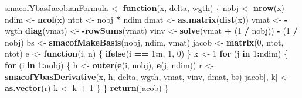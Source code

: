 \documentclass[
  12pt,
]{article}
\newenvironment{Shaded}{\begin{snugshade}}{\end{snugshade}}
\newcommand{\ControlFlowTok}[1]{\textcolor[rgb]{0.13,0.29,0.53}{\textbf{#1}}}
\newcommand{\DecValTok}[1]{\textcolor[rgb]{0.00,0.00,0.81}{#1}}
\newcommand{\FunctionTok}[1]{\textcolor[rgb]{0.13,0.29,0.53}{\textbf{#1}}}
\newcommand{\NormalTok}[1]{#1}
\newcommand{\OtherTok}[1]{\textcolor[rgb]{0.56,0.35,0.01}{#1}}
\newcommand{\SpecialCharTok}[1]{\textcolor[rgb]{0.81,0.36,0.00}{\textbf{#1}}}
\begin{document}
\begin{Shaded}
\begin{Highlighting}[]
\NormalTok{smacofYbasJacobianFormula }\OtherTok{\textless{}{-}} \ControlFlowTok{function}\NormalTok{(x, delta, wgth) \{}
\NormalTok{  nobj }\OtherTok{\textless{}{-}} \FunctionTok{nrow}\NormalTok{(x)}
\NormalTok{  ndim }\OtherTok{\textless{}{-}} \FunctionTok{ncol}\NormalTok{(x)}
\NormalTok{  ntot }\OtherTok{\textless{}{-}}\NormalTok{ nobj }\SpecialCharTok{*}\NormalTok{ ndim}
\NormalTok{  dmat }\OtherTok{\textless{}{-}} \FunctionTok{as.matrix}\NormalTok{(}\FunctionTok{dist}\NormalTok{(x))}
\NormalTok{  vmat }\OtherTok{\textless{}{-}} \SpecialCharTok{{-}}\NormalTok{wgth}
  \FunctionTok{diag}\NormalTok{(vmat) }\OtherTok{\textless{}{-}} \SpecialCharTok{{-}}\FunctionTok{rowSums}\NormalTok{(vmat)}
\NormalTok{  vinv }\OtherTok{\textless{}{-}} \FunctionTok{solve}\NormalTok{(vmat }\SpecialCharTok{+}\NormalTok{ (}\DecValTok{1} \SpecialCharTok{/}\NormalTok{ nobj)) }\SpecialCharTok{{-}}\NormalTok{ (}\DecValTok{1} \SpecialCharTok{/}\NormalTok{ nobj)}
\NormalTok{  bs }\OtherTok{\textless{}{-}} \FunctionTok{smacofMakeBasis}\NormalTok{(nobj, ndim, vmat)}
\NormalTok{  jacob }\OtherTok{\textless{}{-}} \FunctionTok{matrix}\NormalTok{(}\DecValTok{0}\NormalTok{, ntot, ntot)}
\NormalTok{  e }\OtherTok{\textless{}{-}} \ControlFlowTok{function}\NormalTok{(i, n) \{}
    \FunctionTok{ifelse}\NormalTok{(i }\SpecialCharTok{==} \DecValTok{1}\SpecialCharTok{:}\NormalTok{n, }\DecValTok{1}\NormalTok{, }\DecValTok{0}\NormalTok{)}
\NormalTok{  \}}
\NormalTok{  k }\OtherTok{\textless{}{-}} \DecValTok{1}
  \ControlFlowTok{for}\NormalTok{ (j }\ControlFlowTok{in} \DecValTok{1}\SpecialCharTok{:}\NormalTok{ndim) \{}
    \ControlFlowTok{for}\NormalTok{ (i }\ControlFlowTok{in} \DecValTok{1}\SpecialCharTok{:}\NormalTok{nobj) \{}
\NormalTok{      h }\OtherTok{\textless{}{-}} \FunctionTok{outer}\NormalTok{(}\FunctionTok{e}\NormalTok{(i, nobj), }\FunctionTok{e}\NormalTok{(j, ndim))}
\NormalTok{      r }\OtherTok{\textless{}{-}} \FunctionTok{smacofYbasDerivative}\NormalTok{(x, h, delta, wgth, vmat, vinv, dmat, bs)}
\NormalTok{      jacob[, k] }\OtherTok{\textless{}{-}} \FunctionTok{as.vector}\NormalTok{(r)}
\NormalTok{      k }\OtherTok{\textless{}{-}}\NormalTok{ k }\SpecialCharTok{+} \DecValTok{1}
\NormalTok{    \}}
\NormalTok{  \}}
  \FunctionTok{return}\NormalTok{(jacob)}
\NormalTok{\}}


\end{Highlighting}
\end{Shaded}
\end{document}
